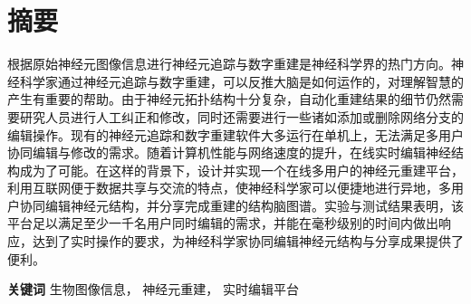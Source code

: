 \chapter{摘要}

根据原始神经元图像信息进行神经元追踪与数字重建是神经科学界的热门方向。神经科学家通过神经元追踪与数字重建，可以反推大脑是如何运作的，对理解智慧的产生有重要的帮助。由于神经元拓扑结构十分复杂，自动化重建结果的细节仍然需要研究人员进行人工纠正和修改，同时还需要进行一些诸如添加或删除网络分支的编辑操作。现有的神经元追踪和数字重建软件大多运行在单机上，无法满足多用户协同编辑与修改的需求。随着计算机性能与网络速度的提升，在线实时编辑神经结构成为了可能。在这样的背景下，设计并实现一个在线多用户的神经元重建平台，利用互联网便于数据共享与交流的特点，使神经科学家可以便捷地进行异地，多用户协同编辑神经元结构，并分享完成重建的结构脑图谱。实验与测试结果表明，该平台足以满足至少一千名用户同时编辑的需求，并能在毫秒级别的时间内做出响应，达到了实时操作的要求，为神经科学家协同编辑神经元结构与分享成果提供了便利。

{
    \vspace{1em}
    \setlength{\parindent}{0em}
    \textbf{关键词} \; 生物图像信息， \; 神经元重建， \; 实时编辑平台 \par
}